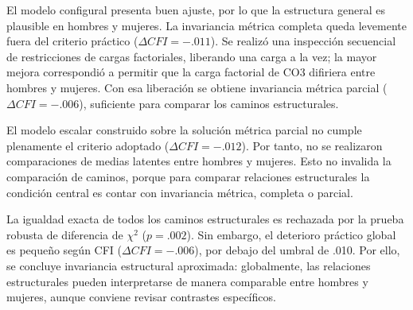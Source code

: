 \documentclass[12pt,letterpaper]{article}
\begin{document}
El modelo configural presenta buen ajuste, por lo que la estructura general es plausible en hombres y mujeres. La invariancia métrica completa queda levemente fuera del criterio práctico ($\Delta CFI=-.011$). Se realizó una inspección secuencial de restricciones de cargas factoriales, liberando una carga a la vez; la mayor mejora correspondió a permitir que la carga factorial de CO3 difiriera entre hombres y mujeres. Con esa liberación se obtiene invariancia métrica parcial ($\Delta CFI=-.006$), suficiente para comparar los caminos estructurales.

El modelo escalar construido sobre la solución métrica parcial no cumple plenamente el criterio adoptado ($\Delta CFI=-.012$). Por tanto, no se realizaron comparaciones de medias latentes entre hombres y mujeres. Esto no invalida la comparación de caminos, porque para comparar relaciones estructurales la condición central es contar con invariancia métrica, completa o parcial.

La igualdad exacta de todos los caminos estructurales es rechazada por la prueba robusta de diferencia de $\chi^2$ ($p=.002$). Sin embargo, el deterioro práctico global es pequeño según CFI ($\Delta CFI=-.006$), por debajo del umbral de .010. Por ello, se concluye invariancia estructural aproximada: globalmente, las relaciones estructurales pueden interpretarse de manera comparable entre hombres y mujeres, aunque conviene revisar contrastes específicos.


\begin{table}[H]
\centering
\caption{Coeficientes estructurales por género en el modelo multigrupo}
\label{tab:p3-coef-genero}
\end{table}
\end{document}

